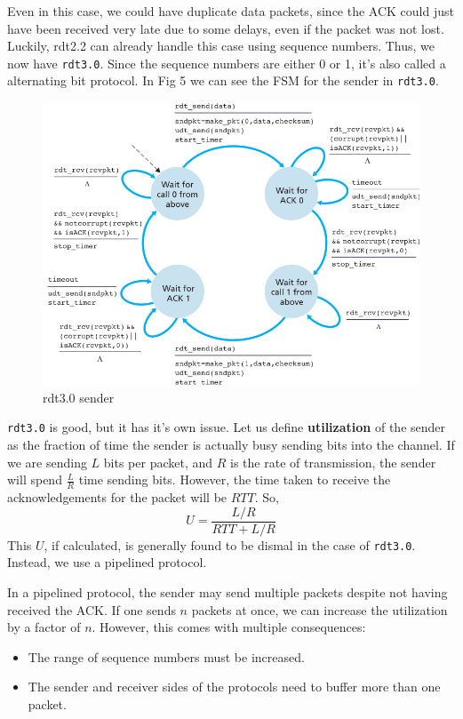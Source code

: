 \documentclass[12pt,letterpaper]{amsbook}
\theoremstyle{definition}
\begin{document}
Even in this case, we could have duplicate data packets, since the ACK could just have been received very late due to some delays, even if the packet was not lost. Luckily, rdt2.2 can already handle this case using sequence numbers. Thus, we now have \texttt{rdt3.0}. Since the sequence numbers are either 0 or 1, it's also called a alternating bit protocol. In Fig 5 we can see the FSM for the sender in \texttt{rdt3.0}.

\begin{figure}[htpb]
  \centering
  \includegraphics[width=0.8\linewidth]{./assets/rdt3_fsm.png}
  \caption{rdt3.0 sender}%
  \label{fig:./assets}
\end{figure}

\texttt{rdt3.0} is good, but it has it's own issue. Let us define \textbf{utilization} of the sender as the fraction of time the sender is actually busy sending bits into the channel. If we are sending $L$ bits per packet, and $R$ is the rate of transmission, the sender will spend $\frac{L}{R}$ time sending bits. However, the time taken to receive the acknowledgements for the packet will be $RTT$. So,
\[U = \frac{L/R}{RTT+L/R}\]
This $U$, if calculated, is generally found to be dismal in the case of \texttt{rdt3.0}. Instead, we use a pipelined protocol.

In a pipelined protocol, the sender may send multiple packets despite not having received the ACK. If one sends $n$ packets at once, we can increase the utilization by a factor of $n$. However, this comes with multiple consequences:

\begin{itemize}
  \item The range of sequence numbers must be increased.
  \item The sender and receiver sides of the protocols need to buffer more than one packet.
\end{itemize}
\end{document}
